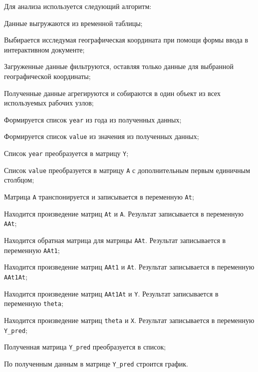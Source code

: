 Для анализа используется следующий алгоритм:
\begin{enumerate_step}
    \item Данные выгружаются из временной таблицы;
    \item Выбирается исследумая географическая координата при помощи формы ввода в интерактивном документе;
    \item Загруженные данные фильтруются, оставляя только данные для выбранной географической координаты;
    \item Полученные данные агрегируются и собираются в один объект из всех используемых рабочих узлов;
    \item Формируется список \texttt{year} из года из полученных данных;
    \item Формируется список \texttt{value} из значения из полученных данных;
    \item Список \texttt{year} преобразуется в матрицу \texttt{Y};
    \item Список \texttt{value} преобразуется в матрицу \texttt{A} с дополнительным первым единичным столбцом;
    \item Матрица \texttt{A} транспонируется и записывается в переменную \texttt{At};
    \item Находится произведение матриц \texttt{At} и \texttt{A}. Результат записывается в переменную \texttt{AAt};
    \item Находится обратная матрица для матрицы \texttt{AAt}. Результат записывается в переменную \texttt{AAt1};
    \item Находится произведение матриц \texttt{AAt1} и \texttt{At}. Результат записывается в переменную \texttt{AAt1At};
    \item Находится произведение матриц \texttt{AAt1At} и \texttt{Y}. Результат записывается в переменную \texttt{theta};
    \item Находится произведение матриц \texttt{theta} и \texttt{X}. Результат записывается в переменную \texttt{Y\_pred};
    \item Полученная матрица \texttt{Y\_pred} преобразуется в список;
    \item По полученным данным в матрице \texttt{Y\_pred} строится график.
\end{enumerate_step}

